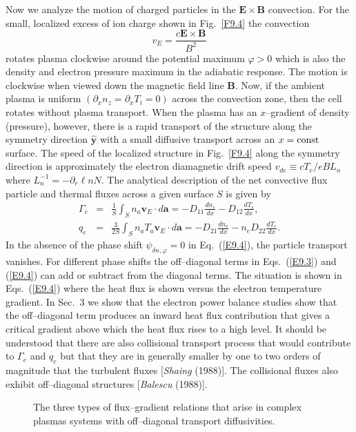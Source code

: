 \documentclass[a4paper,openany,12pt]{book}
\begin{document}
Now we analyze the motion of charged particles in the $\bm{E\times B}$ convection. For the small, localized excess of ion charge shown in Fig.~\ref{F9.4} the convection
\begin{equation}
v_E=\frac{c\bm{E\times B}}{B^2}\label{E9.2}
\end{equation}
rotates plasma clockwise around the potential maximum $\varphi>0$ which is also the density and electron pressure maximum in the adiabatic response. The motion is clockwise when viewed down the magnetic field line $\bm{B}$. Now, if the ambient plasma is uniform $(\partial_x n_z=\partial_x T_i=0)$ across the convection zone, then the cell rotates without plasma transport. When the plasma has an $x$--gradient of density (pressure), however, there is a rapid transport of the structure along the symmetry direction $\widehat{\bm{y}}$ with a small diffusive transport across an $x=\rm const$ surface. The speed of the localized structure in Fig.~\ref{F9.4} along the symmetry direction is approximately the electron diamagnetic drift speed $v_{de}\equiv cT_e/eBL_n$ where $L_n^{-1}=-\partial_r\ell nN$. The analytical description of the net convective flux particle and thermal fluxes across a given surface $S$ is given by
\begin{eqnarray}
\Gamma_e&=&\frac{1}{S}\int_S n_a \bm{v}_E\cdot d\bm{a}=-D_{11}\frac{dn_e}{dx}-
D_{12}\frac{dT_e}{dx},\label{E9.3}\\
q_e&=&\frac{3}{2S}\int_S n_a T_a\bm{v}_E\cdot d\bm{a}=-D_{21}\frac{dn_e}{dx}-n_e D_{22}\frac{dT_e}{dx}.\label{E9.4}
\end{eqnarray}
In the absence of the phase shift $\psi_{\delta n,\varphi}=0$ in Eq.~(\ref{E9.4}), the particle transport vanishes. For different phase shifts the off--diagonal terms in Eqs.~(\ref{E9.3}) and (\ref{E9.4}) can add or subtract from the diagonal terms. The situation is shown in Eqs.~(\ref{E9.4}) where the heat flux is shown versus the electron temperature gradient. In Sec.~3 we show that the electron power balance studies show that the off--diagonal term produces an inward heat flux contribution that gives a critical gradient above which the heat flux rises to a high level. It should be understood that there are also collisional transport process that would contribute to $\Gamma_e$ and $q_e$ but that they are in generally smaller by one to two orders of magnitude that the turbulent fluxes [\emph{Shaing} (1988)]. The collisional fluxes also exhibit off--diagonal structures [\emph{Balescu} (1988)].
%
\begin{figure}[H]
\centerline{}
\caption{The three types of flux--gradient relations that arise in complex plasmas systems with off--diagonal transport diffusivities.}
\label{F9.5}
\end{figure}
%
\end{document}
